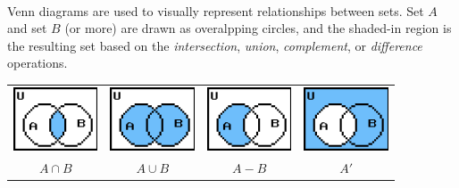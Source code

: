 \documentclass[a4paper,12pt]{book}
\begin{document}
{\begin{intro}{\ }
            ~\\
            Venn diagrams are used to visually represent relationships
            between sets. Set $A$ and set $B$ (or more) are drawn
            as overalpping circles, and the shaded-in region is the
            resulting set based on the \textit{intersection},
            \textit{union}, \textit{complement}, or \textit{difference}
            operations.

            \begin{center}
                \begin{tabular}{c c c c}
                    \includegraphics[width=2.5cm]{images/3-1-intersection.png}
                    &
                    \includegraphics[width=2.5cm]{images/3-1-union.png}
                    &
                    \includegraphics[width=2.5cm]{images/3-1-difference.png}
                    &
                    \includegraphics[width=2.5cm]{images/3-1-complement.png}
                    \\
                    $A \cap B$ &
                    $A \cup B$ &
                    $A - B$ &
                    $A'$
                \end{tabular}
            \end{center}

        \end{intro}
        }{}

        \notonkey{ \newpage }{ \hrulefill }
\end{document}

